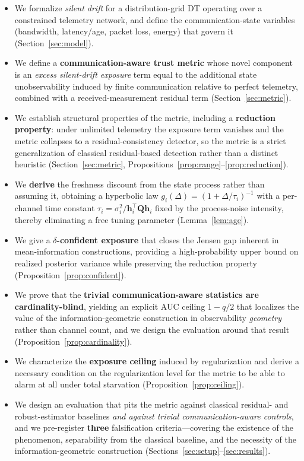 \documentclass[journal]{IEEEtran}
\theoremstyle{plain}
\theoremstyle{definition}
\theoremstyle{remark}
\newcommand{\bh}{\mathbf{h}}
\newcommand{\bQ}{\mathbf{Q}}
\begin{document}
\begin{itemize}
\item We formalize \emph{silent drift} for a distribution-grid DT
operating over a constrained telemetry network, and define the
communication-state variables (bandwidth, latency/age, packet loss,
energy) that govern it (Section~\ref{sec:model}).
\item We define a \textbf{communication-aware trust metric} whose novel
component is an \emph{excess silent-drift exposure} term equal to the
additional state unobservability induced by finite communication relative
to perfect telemetry, combined with a received-measurement residual term
(Section~\ref{sec:metric}).
\item We establish structural properties of the metric, including a
\textbf{reduction property}: under unlimited telemetry the exposure term
vanishes and the metric collapses to a residual-consistency detector, so
the metric is a strict generalization of classical residual-based
detection rather than a distinct heuristic
(Section~\ref{sec:metric}, Propositions~\ref{prop:range}--\ref{prop:reduction}).
\item We \textbf{derive} the freshness discount from the state process
rather than assuming it, obtaining a hyperbolic law
$g_i(\Delta)=(1+\Delta/\tau_i)^{-1}$ with a per-channel time constant
$\tau_i=\sigma_i^{2}/\bh_i^{\top}\bQ\bh_i$ fixed by the process-noise
intensity, thereby eliminating a free tuning parameter
(Lemma~\ref{lem:age}).
\item We give a \textbf{$\delta$-confident exposure} that closes the
Jensen gap inherent in mean-information constructions, providing a
high-probability upper bound on realized posterior variance while
preserving the reduction property (Proposition~\ref{prop:confident}).
\item We prove that the \textbf{trivial communication-aware statistics are
cardinality-blind}, yielding an explicit AUC ceiling $1-q/2$ that
localizes the value of the information-geometric construction in
observability \emph{geometry} rather than channel count, and we design the
evaluation around that result (Proposition~\ref{prop:cardinality}).
\item We characterize the \textbf{exposure ceiling} induced by
regularization and derive a necessary condition on the regularization
level for the metric to be able to alarm at all under total starvation
(Proposition~\ref{prop:ceiling}).
\item We design an evaluation that pits the metric against classical
residual- and robust-estimator baselines \emph{and against trivial
communication-aware controls}, and we pre-register \textbf{three}
falsification criteria---covering the existence of the phenomenon,
separability from the classical baseline, and the necessity of the
information-geometric construction
(Sections~\ref{sec:setup}--\ref{sec:results}).
\end{itemize}
\end{document}
